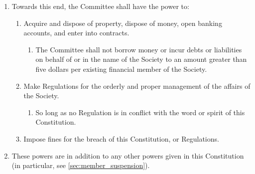 \documentclass[a4paper]{article}
\begin{document}
\begin{enumerate}
    \item Towards this end, the Committee shall have the power to:
    \begin{enumerate}
        \item Acquire and dispose of property, dispose of money, open banking accounts, and enter into contracts.
        \begin{enumerate}
            \item The Committee shall not borrow money or incur debts or liabilities on behalf of or in the name of the Society to an amount greater than five dollars per existing financial member of the Society.
        \end{enumerate}
        \item Make Regulations for the orderly and proper management of the affairs of the Society.
        \begin{enumerate}
            \item So long as no Regulation is in conflict with the word or spirit of this Constitution.
        \end{enumerate}
        \item Impose fines for the breach of this Constitution, or Regulations.
    \end{enumerate}
    \item These powers are in addition to any other powers given in this Constitution (in particular, see \cref{sec:member_suspension}).
\end{enumerate}
\end{document}
